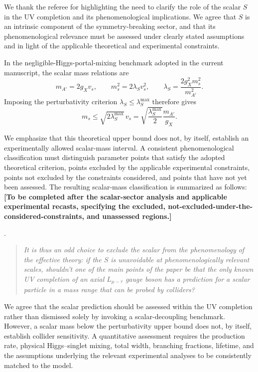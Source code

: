 \documentclass[12pt,a4paper]{article}
\begin{document}
We thank the referee for highlighting the need to clarify the role of the scalar \(S\) in the UV completion and its phenomenological implications. We agree that \(S\) is an intrinsic component of the symmetry-breaking sector, and that its phenomenological relevance must be assessed under clearly stated assumptions and in light of the applicable theoretical and experimental constraints.

In the negligible-Higgs-portal-mixing benchmark adopted in the current manuscript, the scalar mass relations are
\[
m_{A'}=2g_Xv_s,\qquad m_s^2=2\lambda_Sv_s^2,
\qquad
\lambda_S=\frac{2g_X^2m_s^2}{m_{A'}^2}.
\]
Imposing the perturbativity criterion \(\lambda_S\leq\lambda_S^{\max}\) therefore gives
\[
m_s\leq\sqrt{2\lambda_S^{\max}}\,v_s
=\sqrt{\frac{\lambda_S^{\max}}{2}}\frac{m_{A'}}{g_X}.
\]

We emphasize that this theoretical upper bound does not, by itself, establish an experimentally allowed scalar-mass interval. A consistent phenomenological classification must distinguish parameter points that satisfy the adopted theoretical criterion, points excluded by the applicable experimental constraints, points not excluded by the constraints considered, and points that have not yet been assessed. The resulting scalar-mass classification is summarized as follows: \textbf{[To be completed after the scalar-sector analysis and applicable experimental recasts, specifying the excluded, not-excluded-under-the-considered-constraints, and unassessed regions.]}

\medskip
{}. \begin{quote}\itshape
It is thus an odd choice to exclude the scalar from the phenomenology of the effective theory: if the \(S\) is unavoidable at phenomenologically relevant scales, shouldn't one of the main points of the paper be that the only known UV completion of an axial \(L_{\mu-\tau}\) gauge boson has a prediction for a scalar particle in a mass range that can be probed by colliders?\end{quote}

We agree that the scalar prediction should be assessed within the UV completion rather than dismissed solely by invoking a scalar-decoupling benchmark. However, a scalar mass below the perturbativity upper bound does not, by itself, establish collider sensitivity. A quantitative assessment requires the production rate, physical Higgs--singlet mixing, total width, branching fractions, lifetime, and the assumptions underlying the relevant experimental analyses to be consistently matched to the model.
\end{document}
